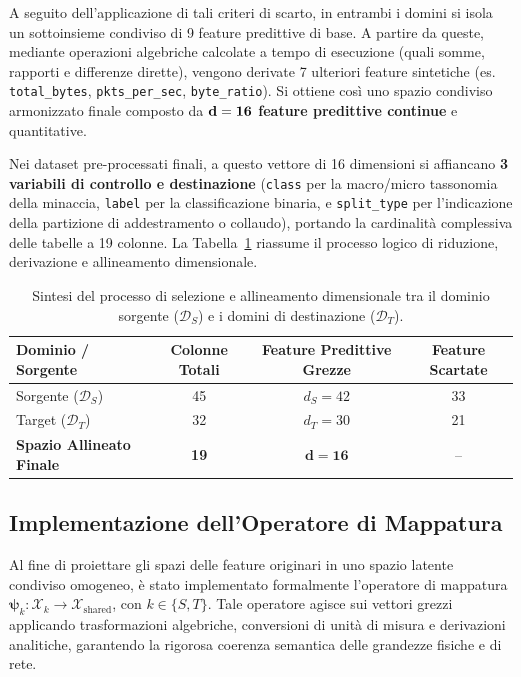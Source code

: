 A seguito dell'applicazione di tali criteri di scarto, in entrambi i domini si isola un sottoinsieme condiviso di 9 feature predittive di base. A partire da queste, mediante operazioni algebriche calcolate a tempo di esecuzione (quali somme, rapporti e differenze dirette), vengono derivate 7 ulteriori feature sintetiche (es. \texttt{total\_bytes}, \texttt{pkts\_per\_sec}, \texttt{byte\_ratio}). Si ottiene così uno spazio condiviso armonizzato finale composto da \textbf{$\bf{d = 16}$ feature predittive continue} e quantitative. 

Nei dataset pre-processati finali, a questo vettore di 16 dimensioni si affiancano \textbf{3 variabili di controllo e destinazione} (\texttt{class} per la macro/micro tassonomia della minaccia, \texttt{label} per la classificazione binaria, e \texttt{split\_type} per l'indicazione della partizione di addestramento o collaudo), portando la cardinalità complessiva delle tabelle a 19 colonne. 
La Tabella~\ref{tab:feature_filtering_summary} riassume il processo logico di riduzione, derivazione e allineamento dimensionale.

\begin{table}[H]
    \centering
    \small
    \caption{Sintesi del processo di selezione e allineamento dimensionale tra il dominio sorgente ($\mathcal{D}_S$) e i domini di destinazione ($\mathcal{D}_T$).}
    \label{tab:feature_filtering_summary}
    \begin{tabular}{lccc}
        \toprule
        \textbf{Dominio / Sorgente} & \textbf{Colonne Totali} & \textbf{Feature Predittive Grezze} & \textbf{Feature Scartate} \\
        \midrule
        Sorgente ($\mathcal{D}_S$) & 45 & $d_S = 42$ & 33 \\
        Target ($\mathcal{D}_T$) & 32 & $d_T = 30$ & 21 \\
        \hline
        \textbf{Spazio Allineato Finale} & \textbf{19} & $\mathbf{d = 16}$ & -- \\
        \bottomrule
    \end{tabular}
\end{table}

\subsection{Implementazione dell'Operatore di Mappatura}
\label{subsec:implementazione_psi}

Al fine di proiettare gli spazi delle feature originari in uno spazio latente condiviso omogeneo, è stato implementato formalmente l'operatore di mappatura $\boldsymbol{\psi}_k : \mathcal{X}_k \to \mathcal{X}_{\text{shared}}$, con $k \in \{S, T\}$. 
Tale operatore agisce sui vettori grezzi applicando trasformazioni algebriche, conversioni di unità di misura e derivazioni analitiche, garantendo la rigorosa coerenza semantica delle grandezze fisiche e di rete.

